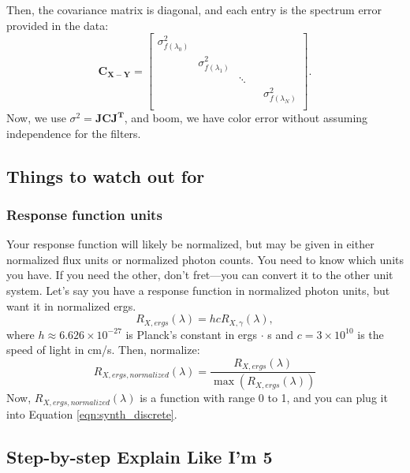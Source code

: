 Then, the covariance matrix is diagonal, and each entry is the spectrum error provided in the data:
\begin{equation}\mathbf{C_{X-Y}} = 
    \begin{bmatrix}
        \sigma_{f(\lambda_{0})}^{2} &  & & \\
         & \sigma_{f(\lambda_{1})}^{2}&  & \\
         &  & \ddots &  \\
        & & & & \sigma_{f(\lambda_{N})}^{2}\\
    \end{bmatrix}.
    \label{eqn:cov}
\end{equation}
Now, we use $\sigma^{2} = \mathbf{JCJ^{T}}$, and boom, we have color error without assuming independence for the filters. 

\subsection{Things to watch out for}
\subsubsection{Response function units}
Your response function will likely be normalized, but may be given in either normalized flux units or normalized photon counts. You need to know which units you have. If you need the other, don't fret---you can convert it to the other unit system. Let's say you have a response function in normalized photon units, but want it in normalized ergs. 
\begin{equation}
    R_{X, ergs}(\lambda) = h c R_{X, \gamma}(\lambda),
\end{equation}
where $h \approx 6.626 \times 10^{-27}$ is Planck's constant in ergs $\cdot$ s and $c = 3 \times 10^{10}$ is the speed of light in cm/s. Then, normalize:
\begin{equation}
    R_{X, ergs, normalized}(\lambda) = \frac{R_{X, ergs}(\lambda)}{\max{(R_{X, ergs}(\lambda))}}
\end{equation}
Now, $R_{X, ergs, normalized}(\lambda)$ is a function with range 0 to 1, and you can plug it into Equation \ref{eqn:synth_discrete}.

\subsection{Step-by-step Explain Like I'm 5}